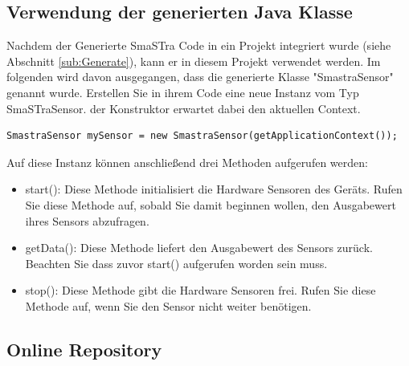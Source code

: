 \subsection{Verwendung der generierten Java Klasse} \label{sub:Use}
Nachdem der Generierte SmaSTra Code in ein Projekt integriert wurde (siehe Abschnitt \ref{sub:Generate}), kann er in diesem Projekt verwendet werden. Im folgenden wird davon ausgegangen, dass die generierte Klasse "SmastraSensor" genannt wurde. Erstellen Sie in ihrem Code eine neue Instanz vom Typ SmaSTraSensor. der Konstruktor erwartet dabei den aktuellen Context.
\\
\begin{lstlisting}
SmastraSensor mySensor = new SmastraSensor(getApplicationContext());
\end{lstlisting}
Auf diese Instanz k\"onnen anschlie{\ss}end drei Methoden aufgerufen werden:
\begin{itemize}
	\item start(): Diese Methode initialisiert die Hardware Sensoren des Ger\"ats. Rufen Sie diese Methode auf, sobald Sie damit beginnen wollen, den Ausgabewert ihres Sensors abzufragen. %
	\item getData(): Diese Methode liefert den Ausgabewert des Sensors zur\"uck. Beachten Sie dass zuvor start() aufgerufen worden sein muss.
	\item stop(): Diese Methode gibt die Hardware Sensoren frei. Rufen Sie diese Methode auf, wenn Sie den Sensor nicht weiter ben\"otigen. %
\end{itemize}

\subsection{Online Repository} \label{sub:Online}
